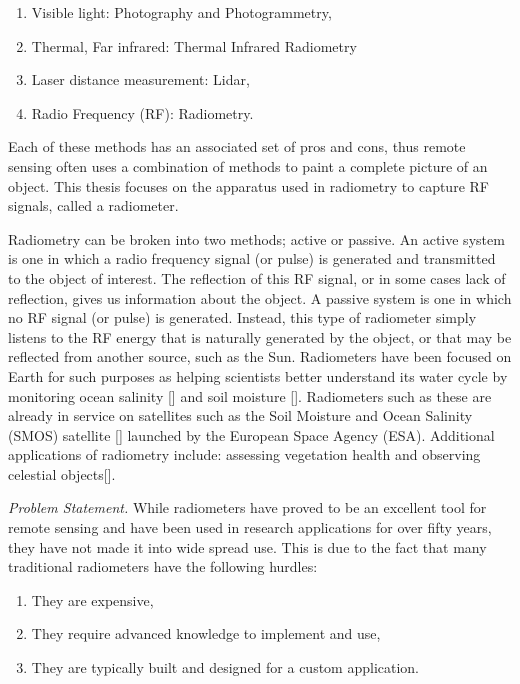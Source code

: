 \begin{enumerate}
\item Visible light: Photography and Photogrammetry,
\item Thermal, Far infrared: Thermal Infrared Radiometry
\item Laser distance measurement: Lidar,
\item Radio Frequency (RF): Radiometry.
\end{enumerate}

Each of these methods has an associated set of pros and cons, thus remote sensing often uses a combination of methods to paint a complete picture of an object.  This thesis focuses on the apparatus used in radiometry to capture RF signals, called a radiometer.

Radiometry can be broken into two methods; active or passive.  An active system is one in which a radio frequency signal (or pulse) is generated and transmitted to the object of interest.  The reflection of this RF signal, or in some cases lack of reflection, gives us information about the object.  A passive system is one in which no RF signal (or pulse) is generated.  Instead, this type of radiometer simply listens to the RF energy that is naturally generated by the object, or that may be reflected from another source, such as the Sun.  Radiometers have been focused on Earth for such purposes as helping scientists better understand its water cycle by monitoring ocean salinity [\cite{Hardy}] and soil moisture [\cite{Liu}].  Radiometers such as these are already in service on satellites such as the Soil Moisture and Ocean Salinity (SMOS) satellite [\cite{McMullan}] launched by the European Space Agency (ESA).  Additional applications of radiometry include: assessing vegetation health and observing celestial objects[\cite{ulaby2014}].

\emph{Problem Statement.}  While radiometers have proved to be an excellent tool for remote sensing and have been used in research applications for over fifty years, they have not made it into wide spread use.  This is due to the fact that many traditional radiometers have the following hurdles:

\begin{enumerate}
\item They are expensive,
\item They require advanced knowledge to implement and use,
\item They are typically built and designed for a custom application.
\end{enumerate}

